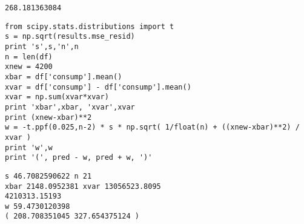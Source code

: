 \documentclass[12pt,fleqn]{article}\usepackage{../common}
\begin{document}
\begin{verbatim}
268.181363084
\end{verbatim}

\begin{verbatim}
from scipy.stats.distributions import t
s = np.sqrt(results.mse_resid)
print 's',s,'n',n
n = len(df)
xnew = 4200
xbar = df['consump'].mean()
xvar = df['consump'] - df['consump'].mean()
xvar = np.sum(xvar*xvar)
print 'xbar',xbar, 'xvar',xvar
print (xnew-xbar)**2
w = -t.ppf(0.025,n-2) * s * np.sqrt( 1/float(n) + ((xnew-xbar)**2) / xvar )
print 'w',w
print '(', pred - w, pred + w, ')'
\end{verbatim}

\begin{verbatim}
s 46.7082590622 n 21
xbar 2148.0952381 xvar 13056523.8095
4210313.15193
w 59.4730120398
( 208.708351045 327.654375124 )
\end{verbatim}
\end{document}
